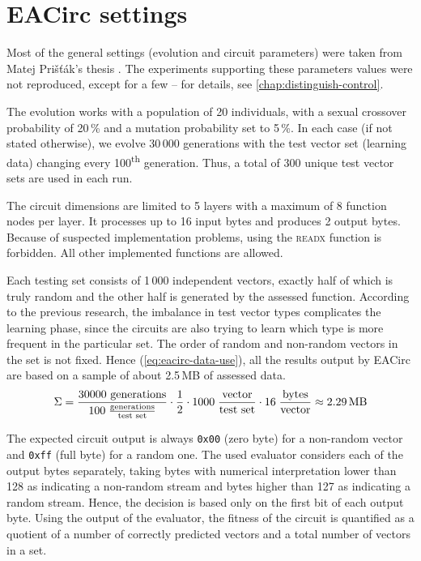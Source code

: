 \documentclass[12pt,oneside]{fithesis2}		%
\renewcommand{\_}{\leavevmode \kern0.0em\vbox{\hrule width0.4em}}
\begin{document}
\section{EACirc settings}
\label{sec:settings-eacirc}

Most of the general settings (evolution and circuit parameters) were taken from Matej Prišťák's thesis \parencite{thesis-pristak}. 
The experiments supporting these parameters values were not reproduced, except for a few -- for details,
see \autoref{chap:distinguish-control}.

The evolution works with a population of 20 individuals, with a sexual crossover probability of 20\,\% and a mutation probability
set to 5\,\%. In each case (if not stated otherwise), we evolve 30\,000 generations with the test vector set
(learning data) changing every 100\textsuperscript{th} generation. Thus, a total of 300 unique test vector sets are used in each run.

The circuit dimensions are limited to 5 layers with a maximum of 8 function nodes per layer. It processes up to 16 input bytes
and produces 2 output bytes. Because of suspected implementation problems, using the \textsc{readx} function is forbidden.
All other implemented functions are allowed.

Each testing set consists of 1\,000 independent vectors, exactly half of which is truly random and the other half is
generated by the assessed function.
According to the previous research, the imbalance in test vector types complicates the learning phase, since the circuits
are also trying to learn which type is more frequent in the particular set. 
The order of random and non-random vectors in the set is not fixed.
Hence (\autoref{eq:eacirc-data-use}), all the results output by EACirc are based on a sample of about 2.5\,MB of assessed data.
\begin{equation}
\label{eq:eacirc-data-use}
\Sigma = \frac{30000 \text{ generations}}{100 \; \frac{\text{generations}}{\text{test set}}}
         \cdot \frac{1}{2} \cdot 1000 \; \frac{\text{vector}}{\text{test set}}
         \cdot 16 \; \frac{\text{bytes}}{\text{vector}}
         \approx 2.29 \text{\,MB}
\end{equation}

The expected circuit output is always \texttt{0x00} (zero byte) for a non-random vector and \texttt{0xff} (full byte) 
for a random one.
The used evaluator considers each of the output bytes separately, taking bytes with numerical interpretation lower than
128 as indicating a non-random stream and bytes higher than 127 as indicating a random stream.
Hence, the decision is based only on the first bit of each output byte.
Using the output of the evaluator, the fitness of the circuit is quantified as a quotient of a number of 
correctly predicted vectors and a total number of vectors in a set.
\end{document}
